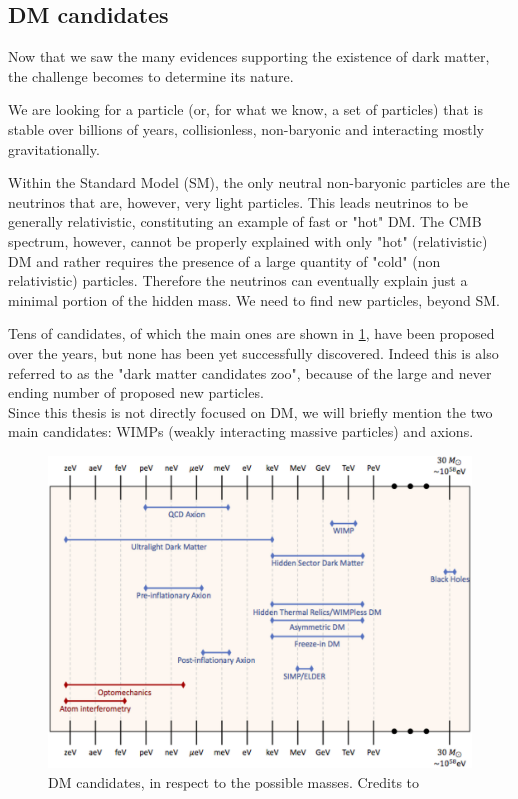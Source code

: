 \subsection{DM candidates}

Now that we saw the many evidences supporting the existence of dark matter, the challenge becomes to determine its nature.

We are looking for a particle (or, for what we know, a set of particles) that is stable over billions of years, collisionless, non-baryonic and interacting mostly gravitationally.

Within the Standard Model (SM), the only neutral non-baryonic particles are the neutrinos that are, however, very light particles.
This leads neutrinos to be generally relativistic, constituting an example of fast or "hot" DM.
The CMB spectrum, however, cannot be properly explained with only "hot" (relativistic) DM and rather requires the presence of a large quantity of "cold" (non relativistic) particles.
Therefore the neutrinos can eventually explain just a minimal portion of the hidden mass.
We need to find new particles, beyond SM.

Tens of candidates, of which the main ones are shown in \cref{fig:dm_candidates}, have been proposed over the years, but none has been yet successfully discovered. Indeed this is also referred to as the "dark matter candidates zoo", because of the large and never ending number of proposed new  particles.\\
Since this thesis is not directly focused on DM, we will briefly mention the two main candidates: WIMPs (weakly interacting massive particles) and axions.

\begin{figure}[ht]
    \centering
    \includegraphics[width=\textwidth]{Theory/figures/candidates_dm.jpg}
    \caption[Dark Matter candidates]{DM candidates, in respect to the possible masses. Credits to \cite{Belenchia2022}}
    \label{fig:dm_candidates}
\end{figure}


